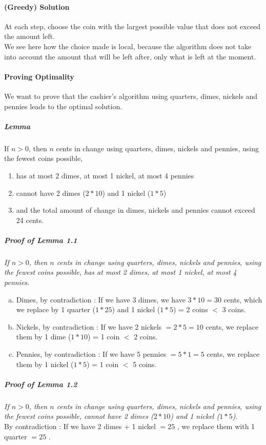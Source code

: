 \documentclass[10pt,a4paper]{book}
\newcommand{\ind}{\hspace*{\parindent}}
\begin{document}
\paragraph*{(Greedy) Solution}
At each step, choose the coin with the largest possible value that does not exceed the amount left. \\
\ind We see here how the choice made is local, because the algorithm does not take into account the amount that will be left after, only what is left at the moment.
\paragraph*{Proving Optimality}
We want to prove that the cashier's algorithm using quarters, dimes, nickels and pennies leads to the optimal solution.
\subparagraph*{Lemma}
If $n > 0$, then $n$ cents in change using quarters, dimes, nickels and pennies, using the fewest coins possible, 
\begin{enumerate}
\item has at most 2 dimes, at most 1 nickel, at most 4 pennies
\item cannot have 2 dimes ($2*10$\textcent) and 1 nickel ($1*5$\textcent)
\item and the total amount of change in dimes, nickels and pennies cannot exceed 24 cents.
\end{enumerate}
\subparagraph*{Proof of Lemma 1.1}
\textit{If $n > 0$, then $n$ cents in change using quarters, dimes, nickels and pennies, using the fewest coins possible, has at most 2 dimes, at most 1 nickel, at most 4 pennies.}
\begin{enumerate}[(a)]
\item Dimes, by contradiction : If we have 3 dimes, we have $3*10 = 30$ cents, which we replace by 1 quarter ($1*25$\textcent) and 1 nickel ($1*5$\textcent) = 2 coins $<$ 3 coins.
\item Nickels, by contradiction : If we have 2 nickels $= 2*5 = 10$ cents, we replace them by 1 dime ($1*10$\textcent) = 1 coin $<$ 2 coins.
\item Pennies, by contradiction : If we have 5 pennies $= 5*1 = 5$ cents, we replace them by 1 nickel ($1*5$\textcent) = 1 coin $<$ 5 coins. 
\end{enumerate}
\subparagraph*{Proof of Lemma 1.2}
\textit{If $n > 0$, then $n$ cents in change using quarters, dimes, nickels and pennies, using the fewest coins possible, cannot have 2 dimes ($2*10$\textcent) and 1 nickel ($1*5$\textcent).}\\
\ind By contradiction : If we have 2 dimes + 1 nickel $= 25$ \textcent, we replace them with 1 quarter $= 25$ \textcent.
\end{document}
